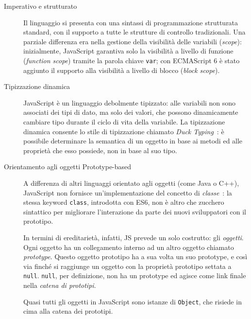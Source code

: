     \begin{description}
      \item[Imperativo e strutturato]
        Il linguaggio si presenta con una sintassi di programmazione strutturata standard, con il supporto a tutte le strutture di controllo tradizionali.
        Una parziale differenza era nella gestione della visibilità delle variabili (\emph{scope}):
        inizialmente, JavaScript garantiva solo la visibilità a livello di funzione (\emph{function scope}) tramite la parola chiave \texttt{var};
        con ECMAScript 6 è stato aggiunto il supporto alla visibilità a livello di blocco (\emph{block scope}).

      \item[Tipizzazione dinamica]
        JavaScript è un linguaggio debolmente tipizzato:
        alle variabili non sono associati dei tipi di dato, ma solo dei valori, che possono dinamicamente cambiare tipo durante il ciclo di vita della variabile.
        La tipizzazione dinamica consente lo stile di tipizzazione chiamato \emph{Duck Typing}~\cite{10.1145/2103621.2103686}:
        è possibile determinare la semantica di un oggetto in base ai metodi ed alle proprietà che esso possiede,  non in base al suo tipo.

      \item[Orientamento agli oggetti Prototype-based]
        A differenza di altri linguaggi orientato agli oggetti (come Java o C++), JavaScript non fornisce un'implementazione del concetto di \emph{classe}~\cite{Ungar1991}:
        la stessa keyword \texttt{class}, introdotta con ES6, non è altro che zucchero sintattico per migliorare l'interazione da parte dei nuovi sviluppatori con il prototipo.

        In termini di ereditarietà, infatti, JS prevede un solo costrutto: gli \emph{oggetti}.
        Ogni oggetto ha un collegamento interno ad un altro oggetto chiamato \emph{prototype}.
        Questo oggetto prototipo ha a sua volta un suo prototype, e così via finché si raggiunge un oggetto con la proprietà prototipo settata a \texttt{null}.
        \texttt{null}, per definizione, non ha un prototype ed agisce come link finale nella \emph{catena di prototipi}.

        Quasi tutti gli oggetti in JavaScript sono istanze di \texttt{Object}, che risiede in cima alla catena dei prototipi.


\end{description}
